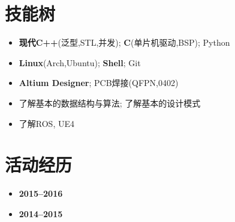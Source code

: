 \documentclass[11pt,a4paper,sans]{moderncv}        %
\begin{document}
\vspace{-6pt}

\section{\yahei 技能树}

\begin{itemize}

	\item{\yahei \textbf{现代C++}(泛型,STL,并发); \textbf{C}(单片机驱动,BSP); Python}
	\item{\yahei \textbf{Linux}(Arch,Ubuntu); \textbf{Shell}; Git}
	\item{\yahei \textbf{Altium Designer}; PCB焊接(QFPN,0402)}
	\item{\yahei 了解基本的数据结构与算法; 了解基本的设计模式}
	\item{\yahei 了解ROS, UE4}

\end{itemize}

\vspace{-6pt}

\section{\yahei 活动经历}

\begin{itemize}

	\item{\hfill\textbf{2015--2016}}




	\item{\hfill\textbf{2014--2015}}



\end{itemize}
\end{document}
